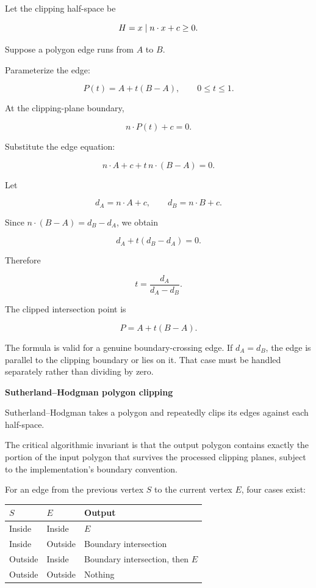 Let the clipping half-space be

\[
H=\\{x\mid n\cdot x+c\ge0\\}.
\]

Suppose a polygon edge runs from \(A\) to \(B\).

Parameterize the edge:

\[
P(t)=A+t(B-A),\qquad 0\le t\le1.
\]

At the clipping-plane boundary,

\[
n\cdot P(t)+c=0.
\]

Substitute the edge equation:

\[
n\cdot A+c+t\,n\cdot(B-A)=0.
\]

Let

\[
d_A=n\cdot A+c,\qquad d_B=n\cdot B+c.
\]

Since \(n\cdot(B-A)=d_B-d_A\), we obtain

\[
d_A+t(d_B-d_A)=0.
\]

Therefore

\[
\boxed{t=\frac{d_A}{d_A-d_B}}.
\]

The clipped intersection point is

\[
P=A+t(B-A).
\]

The formula is valid for a genuine boundary-crossing edge. If \(d_A=d_B\), the edge is parallel to the clipping boundary or lies on it. That case must be handled separately rather than dividing by zero.

\textbf{Sutherland--Hodgman polygon clipping}

Sutherland--Hodgman takes a polygon and repeatedly clips its edges against each half-space.

The critical algorithmic invariant is that the output polygon contains exactly the portion of the input polygon that survives the processed clipping planes, subject to the implementation's boundary convention.

For an edge from the previous vertex \(S\) to the current vertex \(E\), four cases exist:

{\def\LTcaptype{none} %
\begin{longtable}[]{@{}lll@{}}
\toprule\noalign{}
\(S\) & \(E\) & Output \\
\midrule\noalign{}
\endhead
\bottomrule\noalign{}
\endlastfoot
Inside & Inside & \(E\) \\
Inside & Outside & Boundary intersection \\
Outside & Inside & Boundary intersection, then \(E\) \\
Outside & Outside & Nothing \\
\end{longtable}
}

